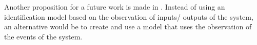 Another proposition for a future work is made in . Instead
of using an identification model based on the observation of inputs\slash
outputs of the system, an alternative would be to create and use a model that uses the observation of
the events of the system.




